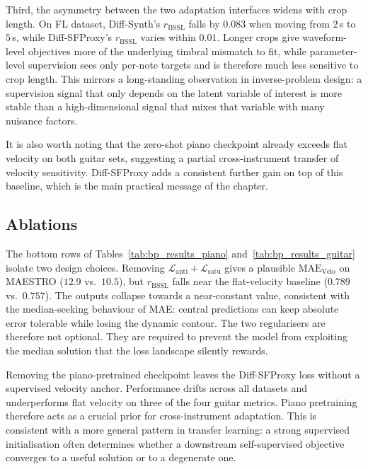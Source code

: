 Third, the asymmetry between the two adaptation interfaces widens with crop length. On FL dataset, Diff-Synth's $r_{\mathrm{BSSL}}$ falls by $0.083$ when moving from $2$\,s to $5$\,s, while Diff-SFProxy's $r_{\mathrm{BSSL}}$ varies within $0.01$. Longer crops give waveform-level objectives more of the underlying timbral mismatch to fit, while parameter-level supervision sees only per-note targets and is therefore much less sensitive to crop length. This mirrors a long-standing observation in inverse-problem design: a supervision signal that only depends on the latent variable of interest is more stable than a high-dimensional signal that mixes that variable with many nuisance factors.

It is also worth noting that the zero-shot piano checkpoint already exceeds flat velocity on both guitar sets, suggesting a partial cross-instrument transfer of velocity sensitivity. Diff-SFProxy adds a consistent further gain on top of this baseline, which is the main practical message of the chapter.

\subsection{Ablations}
\label{ssec:bp:ablations}

The bottom rows of Tables~\ref{tab:bp_results_piano} and~\ref{tab:bp_results_guitar} isolate two design choices. Removing $\mathcal{L}_{\mathrm{anti}} + \mathcal{L}_{\mathrm{satu}}$ gives a plausible $\mathrm{MAE}_{\mathrm{Velo}}$ on MAESTRO ($12.9$ vs.\ $10.5$), but $r_{\mathrm{BSSL}}$ falls near the flat-velocity baseline ($0.789$ vs.\ $0.757$). The outputs collapse towards a near-constant value, consistent with the median-seeking behaviour of MAE: central predictions can keep absolute error tolerable while losing the dynamic contour. The two regularisers are therefore not optional. They are required to prevent the model from exploiting the median solution that the loss landscape silently rewards.

Removing the piano-pretrained checkpoint leaves the Diff-SFProxy loss without a supervised velocity anchor. Performance drifts across all datasets and underperforms flat velocity on three of the four guitar metrics. Piano pretraining therefore acts as a crucial prior for cross-instrument adaptation. This is consistent with a more general pattern in transfer learning: a strong supervised initialisation often determines whether a downstream self-supervised objective converges to a useful solution or to a degenerate one.

